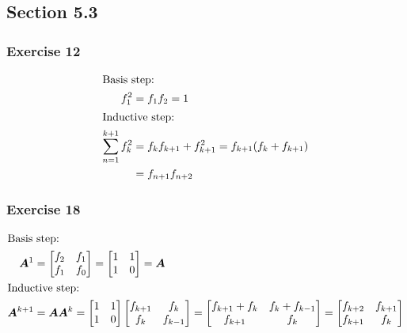 \documentclass[a4paper]{article}
\newcommand{\matr}[1]{\bm{#1}}
\newcommand{\ex}[1]{\subsubsection*{#1}}
\begin{document}
%
%
%



\subsection*{Section 5.3}
\ex{Exercise 12}

\begin{align}
    \intertext{Basis step:}
    f_1^2 &= f_1f_2 = 1 \\
    \intertext{Inductive step:}
    \sum_{n=1}^{k+1}{f_k^2} &= f_kf_{k+1} + f_{k+1}^2 = f_{k+1}(f_k + f_{k+1}) \\
    &= f_{n+1}f_{n+2} \\
\end{align}

\ex{Exercise 18}

\begin{align}
    \intertext{Basis step:}
    \matr{A}^1 &= 
        \begin{bmatrix}
            f_2 & f_1 \\
            f_1 & f_0 \\
        \end{bmatrix} =
        \begin{bmatrix}
            1 & 1 \\
            1 & 0 \\
        \end{bmatrix} = \matr{A} \\
    \intertext{Inductive step:}
    \matr{A}^{k+1} &= \matr{A}\matr{A}^k = 
        \begin{bmatrix}
            1 & 1 \\
            1 & 0 \\
        \end{bmatrix}
        \begin{bmatrix}
            f_{k+1} & f_k \\
            f_k & f_{k-1} \\
        \end{bmatrix} = 
        \begin{bmatrix}
            f_{k+1} + f_k & f_k + f_{k-1} \\
            f_{k+1} & f_k \\
        \end{bmatrix} = 
        \begin{bmatrix}
            f_{k+2} & f_{k+1} \\
            f_{k+1} & f_k \\
        \end{bmatrix}
\end{align}
\end{document}
